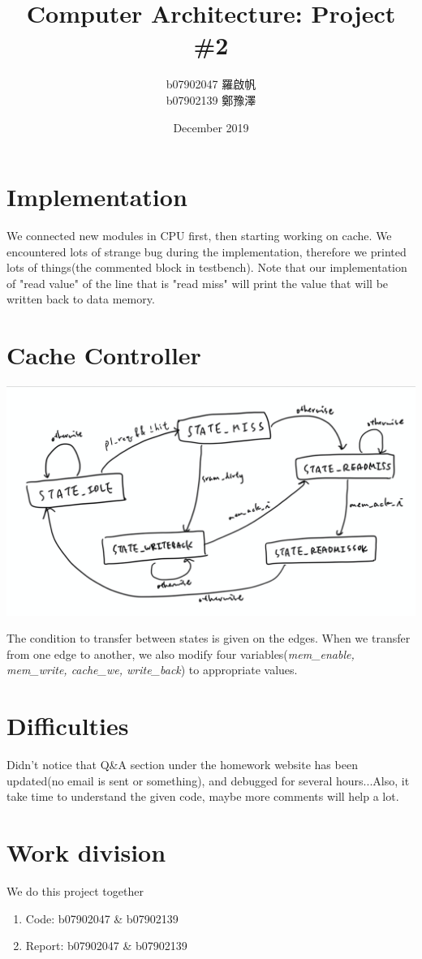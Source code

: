 \documentclass{article}
\title{Computer Architecture: Project \#2}
\author{b07902047 羅啟帆\\ b07902139 鄭豫澤}
\date{December 2019}
\begin{document}
\maketitle


\section{Implementation}

We connected new modules in CPU first, then starting working on cache. We encountered lots of strange bug during the implementation, therefore we printed lots of things(the commented block in testbench). Note that our implementation of "read value" of the line that is "read miss" will print the value that will be written back to data memory.

\section{Cache Controller}

\begin{center}
    \includegraphics[scale=0.25]{pp}
\end{center}

The condition to transfer between states is given on the edges. When we transfer from one edge to another, we also modify four variables(\textit{mem\_enable, mem\_write, cache\_we, write\_back}) to appropriate values.

\section{Difficulties}

Didn't notice that Q\&A section under the homework website has been updated(no email is sent or something), and debugged for several hours...Also, it take time to understand the given code, maybe more comments will help a lot.

\section{Work division}

We do this project together
\begin{enumerate}
    \item Code: b07902047 \& b07902139
    \item Report: b07902047 \& b07902139
\end{enumerate}
\end{document}
